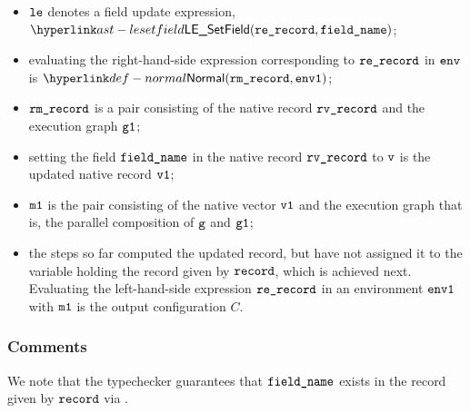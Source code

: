 
\ProseParagraph
\AllApply
\begin{itemize}
  \item $\vle$ denotes a field update expression, $\LESetField(\rerecord, \fieldname)$;
  \item evaluating the right-hand-side expression corresponding to $\rerecord$
  in $\env$ is $\Normal(\rmrecord, \envone)$\ProseOrAbnormal;
  \item $\rmrecord$ is a pair consisting of the native record $\rvrecord$ and
  the execution graph $\vgone$;
  \item setting the field $\fieldname$ in the native record $\rvrecord$ to $\vv$
  is the updated native record $\vvone$;
  \item $\vmone$ is the pair consisting of the native vector $\vvone$ and the
  execution graph that is, the parallel composition of $\vg$ and $\vgone$;
  \item the steps so far computed the updated record, but have not assigned it to
  the variable holding the record given by $\record$, which is achieved next.
  Evaluating the left-hand-side expression $\rerecord$ in an environment $\envone$ with $\vmone$
  is the output configuration $C$.
\end{itemize}

\FormallyParagraph
\begin{mathpar}
\end{mathpar}

\subsubsection{Comments}
We note that the typechecker guarantees that $\fieldname$ exists in the record given by $\record$
via .

